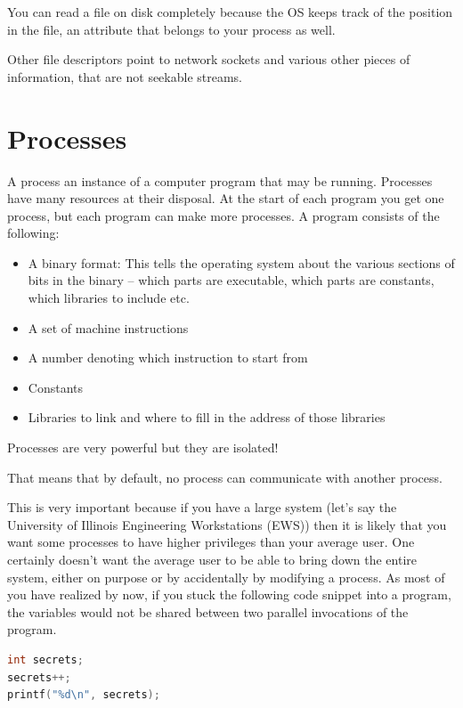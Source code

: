 You can read a file on disk completely because the OS keeps track of the position in the file, an attribute that belongs to your process as well.

Other file descriptors point to network sockets and various other pieces of information, that are not seekable streams.

\section{Processes}

A process an instance of a computer program that may be running.
Processes have many resources at their disposal.
At the start of each program you get one process, but each program can make more processes.
A program consists of the following:

\begin{itemize}
\item A binary format: This tells the operating system about the various sections of bits in the binary -- which parts are executable, which parts are constants, which libraries to include etc.
\item A set of machine instructions
\item A number denoting which instruction to start from
\item Constants
\item Libraries to link and where to fill in the address of those libraries
\end{itemize}

Processes are very powerful but they are isolated!

That means that by default, no process can communicate with another process.

This is very important because if you have a large system (let's say the University of Illinois Engineering Workstations (EWS)) then it is likely that you want some processes to have higher privileges than your average user. One certainly doesn't want the average user to be able to bring down the entire system, either on purpose or by accidentally by modifying a process.
As most of you have realized by now, if you stuck the following code snippet into a program, the variables would not be shared between two parallel invocations of the program.

\begin{lstlisting}[language=C]
int secrets;
secrets++;
printf("%d\n", secrets);
\end{lstlisting}

